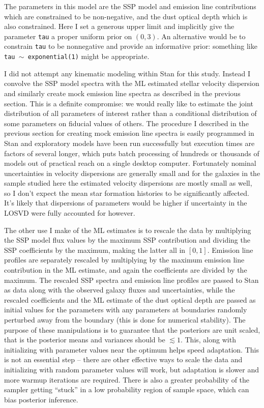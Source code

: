 \documentclass[modern]{aastex62}
\begin{document}
The parameters in this model are the SSP model and emission line contributions which are constrained to be non-negative, and the dust optical depth which is also constrained. Here I set a generous upper limit and implicitly give the parameter \texttt{tau} a proper uniform prior on $(0, 3)$. An alternative would be to constrain \texttt{tau} to be nonnegative and provide an informative prior: something like \texttt{tau $\sim$ exponential(1)} might be appropriate.

I did not attempt any kinematic modeling within Stan for this study. Instead I convolve the SSP model spectra with the ML estimated stellar velocity dispersion and similarly create mock emission line spectra as described in the previous section. This is a definite compromise: we would really like to estimate the joint distribution of all parameters of interest rather than a conditional distribution of some parameters on fiducial values of others. The procedure I described in the previous section for creating mock emission line spectra is easily programmed in Stan and exploratory models have been run successfully but execution times are factors of several longer, which puts batch processing of hundreds or thousands of models out of practical reach on a single desktop computer. Fortunately nominal uncertainties in velocity dispersions are generally small and for the galaxies in the sample studied here the estimated velocity dispersions are mostly small as well, so I don't expect the mean star formation histories to be significantly affected. It's likely that dispersions of parameters would be higher if uncertainty in the LOSVD were fully accounted for however.

The other use I make of the ML estimates is to rescale the data by multiplying the SSP model flux values by the maximum SSP contribution and dividing the SSP coefficients by the maximum, making the latter all in $[0, 1]$. Emission line profiles are separately rescaled by multiplying by the maximum emission line contribution in the ML estimate, and again the coefficients are divided by the maximum. The rescaled SSP spectra and emission line profiles are passed to Stan as data along with the observed galaxy fluxes and uncertainties, while the rescaled coefficients and the ML estimate of the dust optical depth are passed as initial values for the parameters with any parameters at boundaries randomly perturbed away from the boundary (this is done for numerical stability). The purpose of these manipulations is to guarantee that the posteriors are unit scaled, that is the posterior means and variances should be $\lesssim 1$. This, along with initializing with parameter values near the optimum helps speed adaptation. This is not an essential step -- there are other effective ways to scale the data and initializing with random parameter values will work, but adaptation is slower and more warmup iterations are required. There is also a greater probability of the sampler getting ``stuck'' in a low probability region of sample space, which can bias posterior inference.
\end{document}
